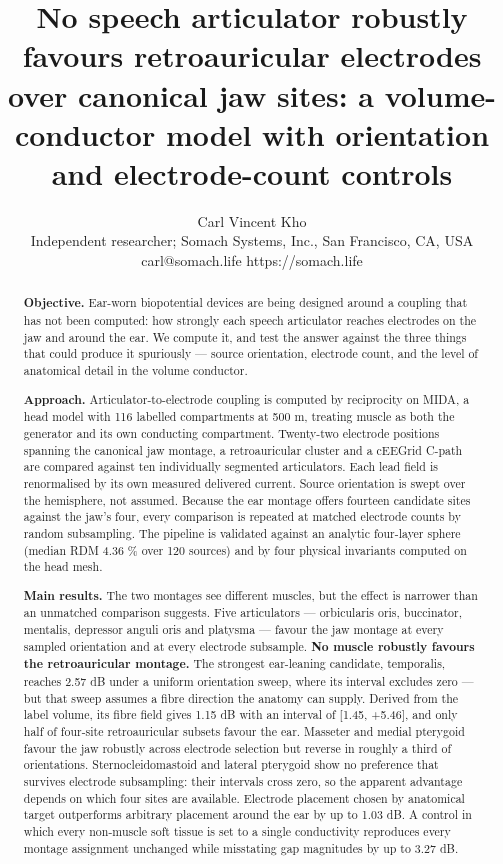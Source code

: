 \documentclass[
  11pt,
  a4paper,
]{article}
\title{No speech articulator robustly favours retroauricular electrodes over canonical jaw sites: a volume-conductor model with orientation and electrode-count controls}
\author{Carl Vincent Kho \\ Independent researcher; Somach Systems, Inc., San Francisco, CA, USA \\ carl@somach.life \textperiodcentered{} https://somach.life}
\date{}
\begin{document}
\maketitle

\begin{abstract}


\textbf{Objective.} Ear-worn biopotential devices are being designed around a
coupling that has not been computed: how strongly each speech articulator
reaches electrodes on the jaw and around the ear. We compute it, and test the
answer against the three things that could produce it spuriously --- source
orientation, electrode count, and the level of anatomical detail in the volume
conductor.

\textbf{Approach.} Articulator-to-electrode coupling is computed by reciprocity on
MIDA, a head model with 116 labelled compartments at 500 \textmu{}m, treating muscle as
both the generator and its own conducting compartment. Twenty-two electrode
positions spanning the canonical jaw montage, a retroauricular cluster and a
cEEGrid C-path are compared against ten individually segmented articulators.
Each lead field is renormalised by its own measured delivered current. Source
orientation is swept over the hemisphere, not assumed. Because the ear
montage offers fourteen candidate sites against the jaw's four, every comparison
is repeated at matched electrode counts by random subsampling. The pipeline is
validated against an analytic four-layer sphere (median RDM 4.36 \% over 120
sources) and by four physical invariants computed on the head mesh.

\textbf{Main results.} The two montages see different muscles, but the effect is
narrower than an unmatched comparison suggests. Five articulators ---
orbicularis oris, buccinator, mentalis, depressor anguli oris and platysma ---
favour the jaw montage at every sampled orientation and at every electrode
subsample. \textbf{No muscle robustly favours the retroauricular montage.} The
strongest ear-leaning candidate, temporalis, reaches \textminus{}2.57 dB under a uniform
orientation sweep, where its interval excludes zero --- but that sweep assumes a
fibre direction the anatomy can supply. Derived from the label volume, its fibre
field gives \textminus{}1.15 dB with an interval of {[}\textminus{}1.45, +5.46{]}, and only half of
four-site retroauricular subsets favour the ear. Masseter and medial pterygoid
favour the jaw robustly across electrode selection but reverse in roughly a
third of orientations. Sternocleidomastoid and lateral pterygoid show no
preference that survives electrode subsampling: their intervals cross zero, so
the apparent advantage depends on which four sites are available. Electrode
placement chosen by anatomical target outperforms arbitrary placement around
the ear by up to 1.03 dB. A control in which every non-muscle soft tissue is
set to a single conductivity reproduces every montage assignment unchanged
while misstating gap magnitudes by up to 3.27 dB.


\end{abstract}
\end{document}
